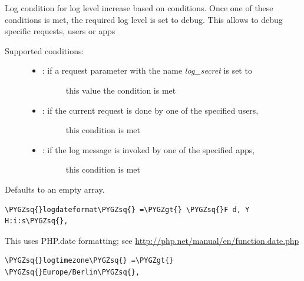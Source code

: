 \documentclass[letterpaper,10pt,english]{sphinxmanual}
\def\PYGZgt{\char`\>}
\def\PYGZsq{\char`\'}
\begin{document}
Log condition for log level increase based on conditions. Once one of these
conditions is met, the required log level is set to debug. This allows to
debug specific requests, users or apps
\begin{description}
\item[{Supported conditions:}] \leavevmode\begin{itemize}
\item {} \begin{description}
\item[{: if a request parameter with the name \emph{log\_secret} is set to}] \leavevmode
this value the condition is met

\end{description}

\item {} \begin{description}
\item[{:  if the current request is done by one of the specified users,}] \leavevmode
this condition is met

\end{description}

\item {} \begin{description}
\item[{:   if the log message is invoked by one of the specified apps,}] \leavevmode
this condition is met

\end{description}

\end{itemize}

\end{description}

Defaults to an empty array.

\begin{Verbatim}[commandchars=\\\{\}]
\PYGZsq{}logdateformat\PYGZsq{} =\PYGZgt{} \PYGZsq{}F d, Y H:i:s\PYGZsq{},
\end{Verbatim}

This uses PHP.date formatting; see \href{http://php.net/manual/en/function.date.php}{http://php.net/manual/en/function.date.php}

\begin{Verbatim}[commandchars=\\\{\}]
\PYGZsq{}logtimezone\PYGZsq{} =\PYGZgt{} \PYGZsq{}Europe/Berlin\PYGZsq{},
\end{Verbatim}
\end{document}
